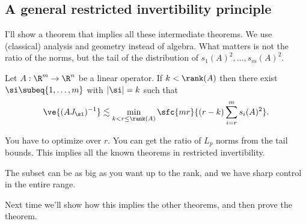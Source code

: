 \subsection{A general restricted invertibility principle}

I'll show a theorem that implies all these intermediate theorems. We use (classical) analysis and geometry instead of algebra.
What matters is not the ratio of the norms, but the tail of the distribution of $s_1(A)^2,\ldots, s_m(A)^2$.
\begin{thm}
Let $A:\R^m\to \R^n$ be a linear operator. If $k<\rank(A)$  then there exist $\si\subeq \{1,\ldots, m\}$ with $|\si|=k$ such that 
\[
\ve{(AJ_\si)^{-1}} \lesssim \min_{k<r\le \rank(A)}\sfc{mr}{(r-k) \sum_{i=r}^m s_i(A)^2}.
\]
\end{thm}
You have to optimize over $r$. You can get the ratio of $L_p$ norms from the tail bounds. This implies all the known theorems in restricted invertibility.

The subset can be as big as you want up to the rank, and we have sharp control in the entire range.

Next time we'll show how this implies the other theorems, and then prove the theorem. %